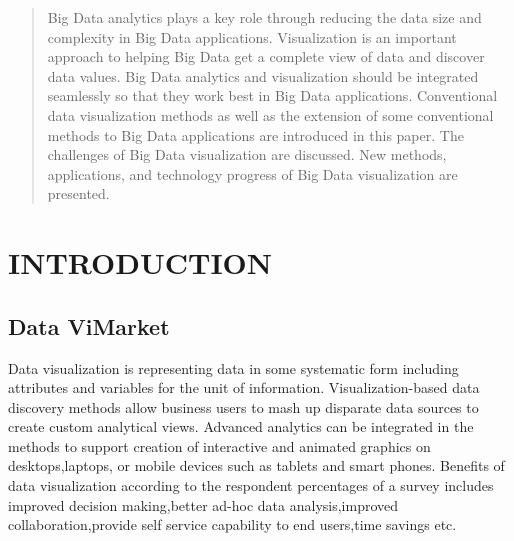 \documentclass[]{report}
\title{}
\author{}
\begin{document}
\maketitle 

\begin{abstract}
	            Big Data analytics plays a key role through reducing the data size and complexity in Big Data applications. Visualization is an important approach to helping Big Data get a complete view of data and discover data values. Big Data analytics and visualization should be integrated seamlessly so that they work best in Big Data applications. Conventional data visualization methods as well as the extension of some conventional methods to Big Data applications are introduced in this paper. The challenges of Big Data visualization are discussed. New methods, applications, and technology progress of Big Data visualization are presented.
\end{abstract}

\tableofcontents
\chapter{INTRODUCTION}
\section {Data Vi Market}
Data visualization is representing data in some systematic form including attributes and variables for the unit of information. Visualization-based data discovery methods allow business users to mash up disparate data sources to create custom analytical views. Advanced analytics can be integrated in the methods to support creation of interactive and animated graphics on desktops,laptops, or mobile devices such as tablets and smart phones. Benefits of data visualization according to the respondent percentages of a survey includes improved decision making,better ad-hoc data analysis,improved collaboration,provide self service capability to end users,time savings etc.
\end{document}
